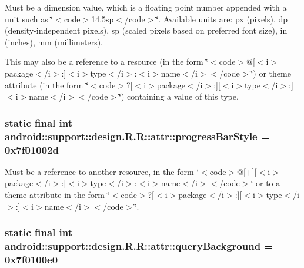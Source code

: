 Must be a dimension value, which is a floating point number appended with a unit such as \char`\"{}$<$code$>$14.5sp$<$/code$>$\char`\"{}. Available units are: px (pixels), dp (density-independent pixels), sp (scaled pixels based on preferred font size), in (inches), mm (millimeters). 

This may also be a reference to a resource (in the form \char`\"{}$<$code$>$@\mbox{[}$<$i$>$package$<$/i$>$:\mbox{]}$<$i$>$type$<$/i$>$:$<$i$>$name$<$/i$>$$<$/code$>$\char`\"{}) or theme attribute (in the form \char`\"{}$<$code$>$?\mbox{[}$<$i$>$package$<$/i$>$:\mbox{]}\mbox{[}$<$i$>$type$<$/i$>$:\mbox{]}$<$i$>$name$<$/i$>$$<$/code$>$\char`\"{}) containing a value of this type. \hypertarget{classandroid_1_1support_1_1design_1_1_r_1_1attr_41b4e53643f32cb274f7494cc9e79577}{
\subsubsection[{progressBarStyle}]{\setlength{\rightskip}{0pt plus 5cm}static final int android::support::design.R.R::attr::progressBarStyle = 0x7f01002d}}
\label{classandroid_1_1support_1_1design_1_1_r_1_1attr_41b4e53643f32cb274f7494cc9e79577}


Must be a reference to another resource, in the form \char`\"{}$<$code$>$@\mbox{[}+\mbox{]}\mbox{[}$<$i$>$package$<$/i$>$:\mbox{]}$<$i$>$type$<$/i$>$:$<$i$>$name$<$/i$>$$<$/code$>$\char`\"{} or to a theme attribute in the form \char`\"{}$<$code$>$?\mbox{[}$<$i$>$package$<$/i$>$:\mbox{]}\mbox{[}$<$i$>$type$<$/i$>$:\mbox{]}$<$i$>$name$<$/i$>$$<$/code$>$\char`\"{}. \hypertarget{classandroid_1_1support_1_1design_1_1_r_1_1attr_593eaa603323dbd8e01cedb6660a6ebf}{
\subsubsection[{queryBackground}]{\setlength{\rightskip}{0pt plus 5cm}static final int android::support::design.R.R::attr::queryBackground = 0x7f0100e0}}
\label{classandroid_1_1support_1_1design_1_1_r_1_1attr_593eaa603323dbd8e01cedb6660a6ebf}


